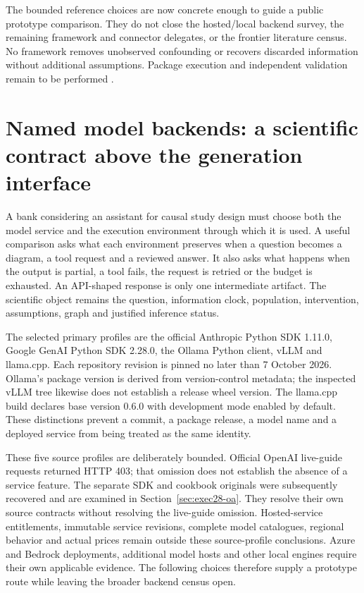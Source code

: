 The bounded reference choices are now concrete enough to guide a public
prototype comparison. They do not close the hosted/local backend survey,
the remaining framework and connector delegates, or the frontier literature
census. No framework removes unobserved confounding or recovers discarded
information without additional assumptions. Package execution and independent validation remain to be performed
\cite{exec24_framework_contracts}.


\section{Named model backends: a scientific contract above the generation interface}
\label{sec:exec24-backend-census}

A bank considering an assistant for causal study design must choose both the
model service and the execution environment through which it is used. A useful
comparison asks what each environment preserves when a question becomes a
diagram, a tool request and a reviewed answer. It also asks what happens when
the output is partial, a tool fails, the request is retried or the budget is
exhausted. An API-shaped response is only one intermediate artifact. The
scientific object remains the question, information clock, population,
intervention, assumptions, graph and justified inference status.
\citep{exec24_backend_reference}

The selected primary profiles are the official Anthropic Python SDK 1.11.0,
Google GenAI Python SDK 2.28.0, the Ollama Python client, vLLM and llama.cpp.
Each repository revision is pinned no later than 7 October 2026. Ollama's
package version is derived from version-control metadata; the inspected
vLLM tree likewise does not establish a release wheel version. The llama.cpp
build declares base version 0.6.0 with development mode enabled by default.
These distinctions prevent a commit, a package release, a model name and a
deployed service from being treated as the same identity.
\citep{exec24_backend_anthropic,exec24_backend_google,exec24_backend_ollama,
exec24_backend_vllm,exec24_backend_llamacpp}

These five source profiles are deliberately bounded. Official OpenAI live-guide
requests returned HTTP 403; that omission does not establish the absence of a
service feature. The separate SDK and cookbook originals were subsequently
recovered and are examined in Section~\ref{sec:exec28-oa}. They resolve their
own source contracts without resolving the live-guide omission. Hosted-service
entitlements, immutable service revisions, complete model catalogues, regional
behavior and actual prices remain outside these source-profile conclusions. Azure and Bedrock deployments, additional
model hosts and other local engines require their own applicable evidence.
The following choices therefore supply a prototype route while leaving the
broader backend census open.~\citep{exec24_backend_reference}

